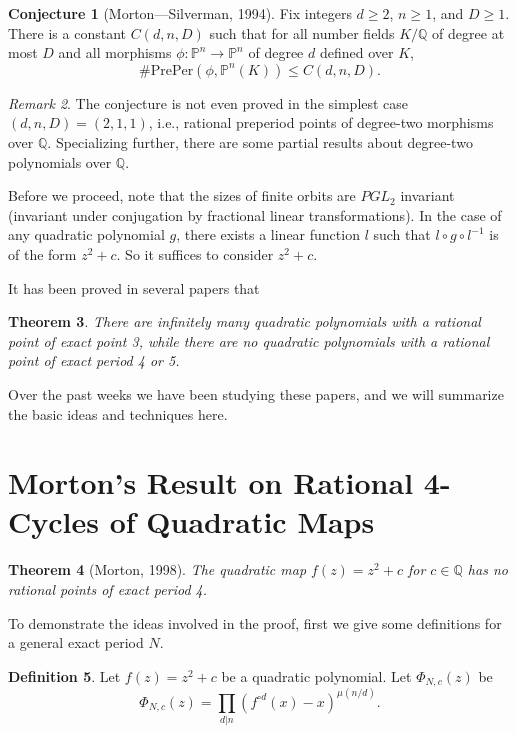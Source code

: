 \documentclass{amsart}
\theoremstyle{plain}
\newtheorem{theorem}{Theorem}[section]
\theoremstyle{definition}
\newtheorem{definition}[theorem]{Definition}
\newtheorem{conjecture}[theorem]{Conjecture}
\theoremstyle{remark}
\newtheorem{remark}[theorem]{Remark}
\renewcommand{\P}{\mathbb{P}}
\newcommand{\Q}{\mathbb{Q}}
\newcommand{\preper}{\mathrm{PrePer}}
\begin{document}
\begin{conjecture}[Morton---Silverman, 1994]
  Fix integers $d \ge 2$, $n \ge 1$, and $D \ge 1$. There is a
  constant $C(d, n, D)$ such that for all number fields $K/\Q$ of
  degree at most $D$ and all morphisms $\phi: \P^n \to \P^n$ of degree
  $d$ defined over $K$,
  \[
  \#\preper(\phi, \P^n(K)) \le C(d, n, D).
  \]
\end{conjecture}

\begin{remark}
  The conjecture is not even proved in the simplest case $(d, n, D) =
  (2, 1, 1)$, i.e., rational preperiod points of degree-two morphisms
  over $\Q$. Specializing further, there are some partial results
  about degree-two polynomials over $\Q$.

  Before we proceed, note that the sizes of finite orbits are $PGL_2$
  invariant (invariant under conjugation by fractional linear
  transformations). In the case of any quadratic polynomial $g$, there
  exists a linear function $l$ such that $l \circ g \circ l^{-1}$ is
  of the form $z^2 + c$. So it suffices to consider $z^2 + c$.

  It has been proved in several papers that
\end{remark}

\begin{theorem}
  There are infinitely many quadratic polynomials with a rational
  point of exact point 3, while there are no quadratic polynomials
  with a rational point of exact period 4 or 5.
\end{theorem}

Over the past weeks we have been studying these papers, and we will
summarize the basic ideas and techniques here.



\section{Morton's Result on Rational 4-Cycles of Quadratic Maps}

\begin{theorem} [Morton, 1998]
  The quadratic map $f(z) = z^2 + c$ for $c \in \Q$ has no rational
  points of exact period 4.
\end{theorem}

To demonstrate the ideas involved in the proof, first we give some
definitions for a general exact period $N$.

\begin{definition}
  Let $f(z) = z^2 + c$ be a quadratic polynomial. Let $\Phi_{N, c}(z)$
  be
  \[
  \Phi_{N,c}(z) = \prod_{d|n}(f^{\circ d}(x) - x)^{\mu(n/d)}.
  \]
\end{definition}
\end{document}
